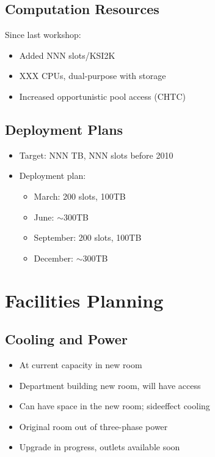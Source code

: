 \documentclass{beamer}
\newcommand{\ca}{\ensuremath{\sim}}
\begin{document}
\subsection{Computation Resources}
\begin{frame}
Since last workshop:
\begin{itemize}
    \item Added NNN slots/KSI2K
    \item XXX CPUs, dual-purpose with storage
    \item Increased opportunistic pool access (CHTC)
\end{itemize}
\end{frame}

\subsection{Deployment Plans}
\begin{frame}
\begin{itemize}
    \item Target: NNN TB, NNN slots before 2010
    \item Deployment plan:
    \begin{itemize}
        \item March: 200 slots, 100TB
        \item June: \ca{}300TB
        \item September: 200 slots, 100TB
        \item December: \ca{}300TB
    \end{itemize}
\end{itemize}
\end{frame}

\section{Facilities Planning}
\subsection{Cooling and Power}
\begin{frame}
\begin{itemize}
    \item At current capacity in new room
    \item Department building new room, will have access
    \item Can have space in the new room; sideeffect cooling
    \item Original room out of three-phase power
    \item Upgrade in progress, outlets available soon
\end{itemize}
\end{frame}
\end{document}

